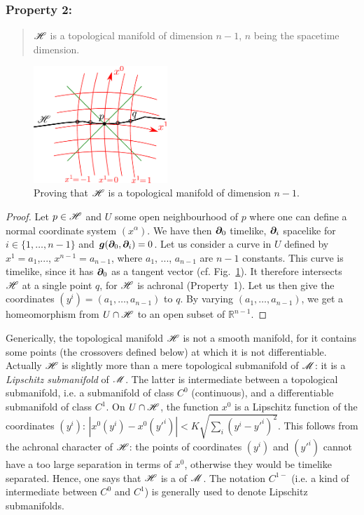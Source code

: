 \subsubsection{Property 2:}
\begin{quote}
$\mathscr{H}$ is a topological manifold of dimension $n-1$, $n$ being the spacetime
dimension.
\end{quote}

\begin{figure}
\centerline{\includegraphics[width=0.45\textwidth]{glo_hor_manifold.pdf}}
\caption[]{\label{f:glo:hor_manifold} \footnotesize
Proving that $\mathscr{H}$ is a topological manifold of dimension $n-1$.}
\end{figure}

\begin{proof}
Let $p\in\mathscr{H}$ and $U$ some open neighbourhood of $p$ where one can define
a normal coordinate system $(x^\alpha)$. We have then $\bm{\partial}_0$ timelike,
$\bm{\partial}_i$ spacelike for $i\in\{1,\ldots,n-1\}$ and $\bm{g}(\bm{\partial}_0, \bm{\partial}_i) = 0$.
Let us consider a curve in $U$ defined by $x^1 = a_1$,..., $x^{n-1} = a_{n-1}$,
where $a_1$, ..., $a_{n-1}$ are $n-1$ constants.
This curve is timelike, since it has $\bm{\partial}_0$ as a tangent vector
(cf. Fig.~\ref{f:glo:hor_manifold}).
It therefore intersects $\mathscr{H}$ at a single point $q$, for $\mathscr{H}$ is achronal (Property~1).
Let us then give the coordinates $(y^i) = (a_1,\ldots,a_{n-1})$ to $q$.
By varying $(a_1,\ldots,a_{n-1})$, we get a homeomorphism from $U\cap\mathscr{H}$
to an open subset of $\mathbb{R}^{n-1}$.
\end{proof}

\begin{remark}
Generically, the topological manifold $\mathscr{H}$ is not a smooth manifold, for it
contains some points (the crossovers defined below) at which it is not differentiable.
Actually $\mathscr{H}$ is slightly more than a mere topological submanifold of $\mathscr{M}$: it is a
\emph{Lipschitz submanifold} of $\mathscr{M}$. The latter is
intermediate between a topological submanifold, i.e.
a submanifold of class $C^0$ (continuous), and a differentiable submanifold of
class $C^1$. On $U\cap\mathscr{H}$, the function $x^0$ is a Lipschitz function
of the coordinates $(y^i)$: $\left|x^0(y^i) - x^0({y'}^i)\right| < K \sqrt{\sum_i (y^i - {y'}^i)^2}$.
This follows from the achronal character of $\mathscr{H}$: the points of coordinates
$(y^i)$ and $({y'}^i)$ cannot have a too large separation in terms of $x^0$,
otherwise they would be timelike separated.
Hence, one says that $\mathscr{H}$ is a  of $\mathscr{M}$. The notation $C^{1-}$ (i.e. a kind of intermediate between
$C^0$ and $C^1$) is generally used to denote Lipschitz submanifolds.
\end{remark}

